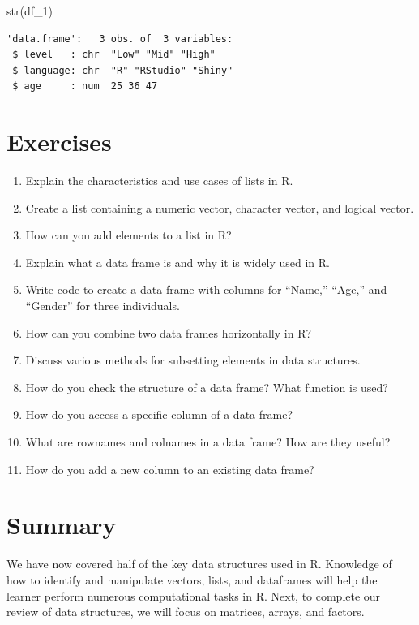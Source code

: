 \documentclass[
  letterpaper,
  DIV=11,
  numbers=noendperiod]{scrreprt}
\newenvironment{Shaded}{\begin{snugshade}}{\end{snugshade}}
\newcommand{\FunctionTok}[1]{\textcolor[rgb]{0.28,0.35,0.67}{#1}}
\newcommand{\NormalTok}[1]{\textcolor[rgb]{0.00,0.23,0.31}{#1}}
\begin{document}
\begin{Shaded}
\begin{Highlighting}[]
\FunctionTok{str}\NormalTok{(df\_1)}
\end{Highlighting}
\end{Shaded}

\begin{verbatim}
'data.frame':   3 obs. of  3 variables:
 $ level   : chr  "Low" "Mid" "High"
 $ language: chr  "R" "RStudio" "Shiny"
 $ age     : num  25 36 47
\end{verbatim}

\section{Exercises}\label{exercises-9}

\begin{enumerate}
\def\labelenumi{\roman{enumi}.}
\item
  Explain the characteristics and use cases of lists in R.
\item
  Create a list containing a numeric vector, character vector, and
  logical vector.
\item
  How can you add elements to a list in R?
\item
  Explain what a data frame is and why it is widely used in R.
\item
  Write code to create a data frame with columns for ``Name,'' ``Age,''
  and ``Gender'' for three individuals.
\item
  How can you combine two data frames horizontally in R?
\item
  Discuss various methods for subsetting elements in data structures.
\item
  How do you check the structure of a data frame? What function is used?
\item
  How do you access a specific column of a data frame?
\item
  What are rownames and colnames in a data frame? How are they useful?
\item
  How do you add a new column to an existing data frame?
\end{enumerate}

\section{Summary}\label{summary-9}

We have now covered half of the key data structures used in R. Knowledge
of how to identify and manipulate vectors, lists, and dataframes will
help the learner perform numerous computational tasks in R. Next, to
complete our review of data structures, we will focus on matrices,
arrays, and factors.
\end{document}

